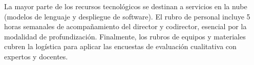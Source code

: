 \documentclass[12pt,letterpaper]{article}
\begin{document}
La mayor parte de los recursos tecnológicos se destinan a servicios en la nube (modelos de lenguaje y despliegue de software). El rubro de personal incluye 5 horas semanales de acompañamiento del director y codirector, esencial por la modalidad de profundización. Finalmente, los rubros de equipos y materiales cubren la logística para aplicar las encuestas de evaluación cualitativa con expertos y docentes.
\newpage
\renewcommand{\refname}{REFERENCIAS}


\end{document}
